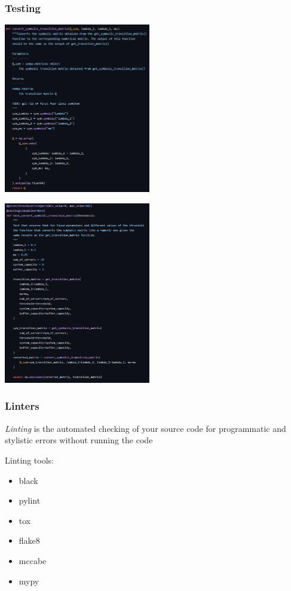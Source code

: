 \begin{frame}
    \frametitle{Testing}
    
    \begin{multicols}{2}
        \includegraphics[width=0.48\textwidth]{Bin/ambulance_game_code.PNG}

        \columnbreak

        \includegraphics[width=0.48\textwidth]{Bin/ambulance_game_test.PNG}
    \end{multicols}

\end{frame}


\begin{frame}
    \frametitle{Linters}
    \centering

    \textit{Linting} is the automated checking of your source code for 
    programmatic and stylistic errors without running the code
    
    \vspace{1cm}

    Linting tools:
    
    \begin{multicols}{3}
        \begin{itemize}
            \item black
            \item pylint
            \item tox
            \item flake8
            \item mccabe
            \item mypy
        \end{itemize}
    \end{multicols}
\end{frame}


